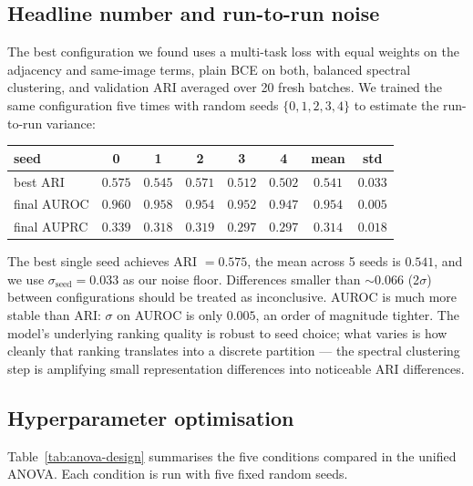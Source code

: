 \documentclass[12pt, a4paper]{article}
\begin{document}
\subsection{Headline number and run-to-run noise}

The best configuration we found uses a multi-task loss with equal weights on the
adjacency and same-image terms, plain BCE on both, balanced spectral clustering,
and validation ARI averaged over 20 fresh batches. We trained the same
configuration five times with random seeds $\{0, 1, 2, 3, 4\}$ to estimate the
run-to-run variance:

\begin{center}
\begin{tabular}{lccccc|cc}
\toprule
\textbf{seed} & 0 & 1 & 2 & 3 & 4 & \textbf{mean} & \textbf{std} \\
\midrule
best ARI       & $0.575$ & $0.545$ & $0.571$ & $0.512$ & $0.502$ & $0.541$ & $\mathbf{0.033}$ \\
final AUROC    & $0.960$ & $0.958$ & $0.954$ & $0.952$ & $0.947$ & $0.954$ & $0.005$ \\
final AUPRC    & $0.339$ & $0.318$ & $0.319$ & $0.297$ & $0.297$ & $0.314$ & $0.018$ \\
\bottomrule
\end{tabular}
\end{center}

The best single seed achieves ARI $= 0.575$, the mean across 5 seeds is
$0.541$, and we use $\sigma_{\text{seed}} = 0.033$ as our noise floor.
Differences smaller than $\sim 0.066$ (2$\sigma$) between configurations
should be treated as inconclusive. AUROC is much more stable than ARI:
$\sigma$ on AUROC is only $0.005$, an order of magnitude tighter. The
model's underlying ranking quality is robust to seed choice; what varies
is how cleanly that ranking translates into a discrete partition --- the
spectral clustering step is amplifying small representation differences
into noticeable ARI differences.

\subsection{Hyperparameter optimisation}
\label{sec:hparam-design}

Table~\ref{tab:anova-design} summarises the five conditions compared in the
unified ANOVA. Each condition is run with five fixed random seeds.
\end{document}

